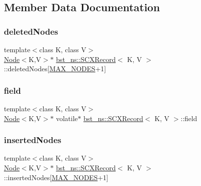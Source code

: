 \subsection{Member Data Documentation}
\mbox{\label{classbst__ns_1_1SCXRecord_a58674d554b988380986ffac69a7e2103}} 
\subsubsection{\texorpdfstring{deleted\+Nodes}{deletedNodes}}
{\footnotesize\ttfamily template$<$class K, class V$>$ \\
\hyperlink{classbst__ns_1_1Node}{Node}$<$K,V$>$$\ast$ \hyperlink{classbst__ns_1_1SCXRecord}{bst\+\_\+ns\+::\+S\+C\+X\+Record}$<$ K, V $>$\+::deleted\+Nodes\mbox{[}\hyperlink{scxrecord_8h_abd2aacdca9cb2a1a30f3392256b96ea3}{M\+A\+X\+\_\+\+N\+O\+D\+ES}+1\mbox{]}}

\mbox{\label{classbst__ns_1_1SCXRecord_a539ffffd648f59666ebab5bc1cae180f}} 
\subsubsection{\texorpdfstring{field}{field}}
{\footnotesize\ttfamily template$<$class K, class V$>$ \\
\hyperlink{classbst__ns_1_1Node}{Node}$<$K,V$>$$\ast$ volatile$\ast$ \hyperlink{classbst__ns_1_1SCXRecord}{bst\+\_\+ns\+::\+S\+C\+X\+Record}$<$ K, V $>$\+::field}

\mbox{\label{classbst__ns_1_1SCXRecord_ad168d1132cbd02e63917cb601faa082f}} 
\subsubsection{\texorpdfstring{inserted\+Nodes}{insertedNodes}}
{\footnotesize\ttfamily template$<$class K, class V$>$ \\
\hyperlink{classbst__ns_1_1Node}{Node}$<$K,V$>$$\ast$ \hyperlink{classbst__ns_1_1SCXRecord}{bst\+\_\+ns\+::\+S\+C\+X\+Record}$<$ K, V $>$\+::inserted\+Nodes\mbox{[}\hyperlink{scxrecord_8h_abd2aacdca9cb2a1a30f3392256b96ea3}{M\+A\+X\+\_\+\+N\+O\+D\+ES}+1\mbox{]}}

